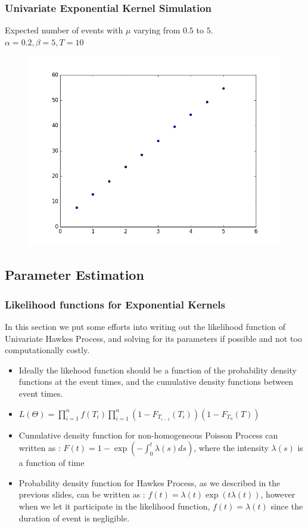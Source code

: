 \documentclass{beamer}
\begin{document}
\begin{frame}
\frametitle{Univariate Exponential Kernel Simulation}
Expected number of events with $\mu$ varying from $0.5$ to $5$.\\
$\alpha = 0.2, \beta = 5, T = 10$
\begin{figure}[h]
      \centering
	\includegraphics[scale=0.45]{image/MuSimulation.png}
\end{figure}
\end{frame}

\subsection{Parameter Estimation}
\begin{frame}
\frametitle{Likelihood functions for Exponential Kernels}
In this section we put some efforts into writing out the likelihood function of Univariate Hawkes Process, and solving for its parameters if possible and not too computationally costly.
\begin{itemize}
	\item Ideally the likehood function should be a function of the probability density functions at the event times, and the cumulative density functions between event times.
	\item $L(\Theta) = \prod_{i=1}^n f(T_{i}) \prod_{i=1}^n (1-F_{T_{i-1}}(T_i)) (1-F_{T_{n}}(T))$
	\item Cumulative density function for non-homogeneous Poisson Process can written as : $F(t) = 1 - \exp(-\int_0^t \lambda(s) ds)$, where the intensity $\lambda(s)$ is a function of time
	\item Probability density function for Hawkes Process, as we described in the previous slides, can be written as : $f(t) = \lambda(t) \exp(t\lambda(t))$, however when we let it participate in the likelihood function, $f(t) = \lambda(t)$ since the duration of event is negligible.
\end{itemize}
\end{frame}
\end{document}
